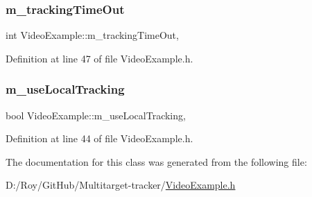 \subsubsection{\texorpdfstring{m\+\_\+tracking\+Time\+Out}{m\_trackingTimeOut}}
{\footnotesize\ttfamily int Video\+Example\+::m\+\_\+tracking\+Time\+Out\hspace{0.3cm}{\ttfamily [protected]}, {\ttfamily [inherited]}}



Definition at line 47 of file Video\+Example.\+h.

\mbox{\label{class_video_example_a951ee017c4fbb180dfc965a9a35ac69f}} 
\subsubsection{\texorpdfstring{m\+\_\+use\+Local\+Tracking}{m\_useLocalTracking}}
{\footnotesize\ttfamily bool Video\+Example\+::m\+\_\+use\+Local\+Tracking\hspace{0.3cm}{\ttfamily [protected]}, {\ttfamily [inherited]}}



Definition at line 44 of file Video\+Example.\+h.



The documentation for this class was generated from the following file\+:\begin{DoxyCompactItemize}
\item 
D\+:/\+Roy/\+Git\+Hub/\+Multitarget-\/tracker/\mbox{\hyperlink{_video_example_8h}{Video\+Example.\+h}}\end{DoxyCompactItemize}
